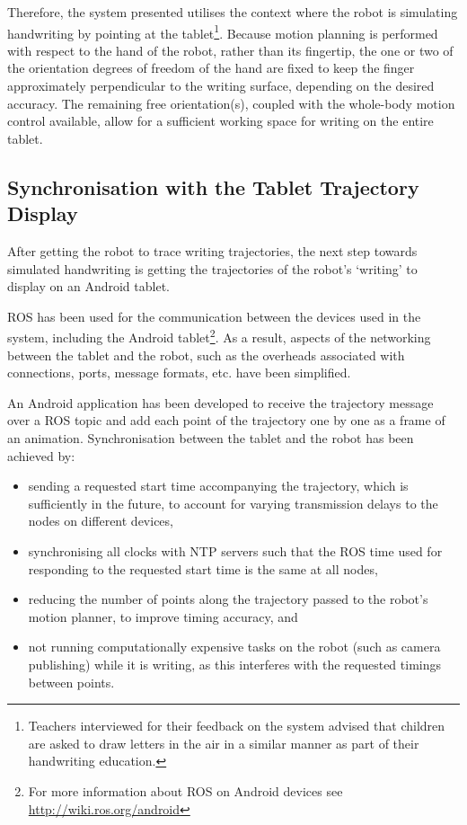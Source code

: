 \documentclass{sig-alternate}
\begin{document}
Therefore, the system presented utilises the context where the robot is
simulating handwriting by pointing at the tablet\footnote{Teachers interviewed
for their feedback on the system advised that children are asked to draw letters
in the air in a similar manner as part of their handwriting education.}. Because
motion planning is performed with respect to the hand of the robot, rather than
its fingertip, the one or two of the orientation degrees of freedom of the hand
are fixed to keep the finger approximately perpendicular to the writing surface,
depending on the desired accuracy. The remaining free orientation(s), coupled
with the whole-body motion control available, allow for a sufficient working
space for writing on the entire tablet.

\subsection{Synchronisation with the Tablet Trajectory Display}\label{sec:tabletSynch}

After getting the robot to trace writing trajectories, the next step towards
simulated handwriting is getting the trajectories of the robot's `writing' to
display on an Android tablet. 

ROS has been used for the communication between the devices used in the system,
including the Android tablet\footnote{For more information about ROS on Android
devices see \url{http://wiki.ros.org/android}}. As a result, aspects of the
networking between the tablet and the robot, such as the overheads associated
with connections, ports, message formats, etc. have been simplified. 

An Android application has been developed to receive the trajectory message over
a ROS topic and add each point of the trajectory one by one as a frame of an
animation. Synchronisation between the tablet and the robot has been achieved by:

\begin{itemize}

    \item sending a requested start time accompanying the trajectory, which is
        sufficiently in the future, to account for varying transmission delays
        to the nodes on different devices,

    \item synchronising all clocks with NTP servers such that the ROS time used
        for responding to the requested start time is the same at all nodes,

    \item reducing the number of points along the trajectory passed to the
        robot's motion planner, to improve timing accuracy, and

    \item not running computationally expensive tasks on the robot (such as
        camera publishing) while it is writing, as this interferes with the
        requested timings between points. 

\end{itemize}
\end{document}
